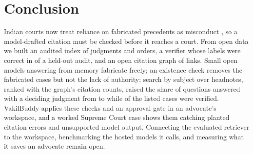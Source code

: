 \section{Conclusion}
\label{sec:conclusion}
Indian courts now treat reliance on fabricated precedents as misconduct \cite{gummadi}, so a model-drafted citation must be checked before it reaches a court. From open data we built an audited index of \CorpusTotal{} judgments and orders, a verifier whose labels were correct in \AuditPct{} of a held-out audit, and an open citation graph of \GraphEdges{} links. Small open models answering from memory fabricate freely; an existence check removes the fabricated cases but not the lack of authority; search by subject over headnotes, ranked with the graph's citation counts, raised the share of questions answered with a deciding judgment from \RefRateClosed{} to \RefRateTopicPrior{} while \VerPctAllTopicPrior{} of the listed cases were verified. VakilBuddy applies these checks and an approval gate in an advocate's workspace, and a worked Supreme Court case shows them catching planted citation errors and unsupported model output. Connecting the evaluated retriever to the workspace, benchmarking the hosted models it calls, and measuring what it saves an advocate remain open.
